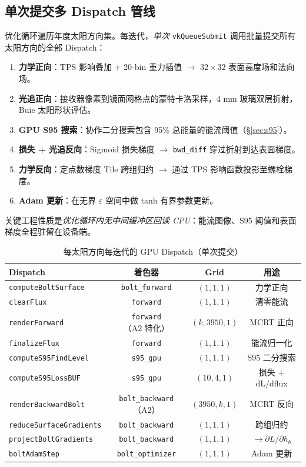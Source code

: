 \documentclass[12pt,a4paper]{ctexart}
\begin{document}
\subsection{单次提交多 Dispatch 管线}

优化循环遍历年度太阳方向集。每迭代，\emph{单次} \verb|vkQueueSubmit| 调用批量提交所有太阳方向的全部 Dispatch：

\begin{enumerate}
  \item \textbf{力学正向}：TPS 影响叠加 + 20-bin 重力插值 $\rightarrow$ $32\times32$ 表面高度场和法向场。
  \item \textbf{光追正向}：接收器像素到镜面网格点的蒙特卡洛采样，4 mm 玻璃双层折射，Buie 太阳形状评估。
  \item \textbf{GPU S95 搜索}：协作二分搜索包含 95\% 总能量的能流阈值（\S\ref{sec:s95}）。
  \item \textbf{损失 + 光追反向}：Sigmoid 损失梯度 $\rightarrow$ \verb|bwd_diff| 穿过折射到达表面梯度。
  \item \textbf{力学反向}：定点数梯度 Tile 跨组归约 $\rightarrow$ 通过 TPS 影响函数投影至螺栓梯度。
  \item \textbf{Adam 更新}：在无界 $\varepsilon$ 空间中做 tanh 有界参数更新。
\end{enumerate}

关键工程性质是\emph{优化循环内无中间缓冲区回读 CPU}：能流图像、S95 阈值和表面梯度全程驻留在设备端。

\begin{table}[t]
\centering
\caption{每太阳方向每迭代的 GPU Dispatch（单次提交）}
\label{tab:dispatch}
\small
\begin{tabular}{lccc}
\toprule
Dispatch & 着色器 & Grid & 用途 \\
\midrule
\verb|computeBoltSurface| & \verb|bolt_forward| & $(1,1,1)$ & 力学正向 \\
\verb|clearFlux| & \verb|forward| & $(1,1,1)$ & 清零能流 \\
\verb|renderForward| & \verb|forward|（A2 特化） & $(k,3950,1)$ & MCRT 正向 \\
\verb|finalizeFlux| & \verb|forward| & $(1,1,1)$ & 能流归一化 \\
\verb|computeS95FindLevel| & \verb|s95_gpu| & $(1,1,1)$ & S95 二分搜索 \\
\verb|computeS95LossBUF| & \verb|s95_gpu| & $(10,4,1)$ & 损失 + dL/dflux \\
\verb|renderBackwardBolt| & \verb|bolt_backward| （A2） & $(3950,k,1)$ & MCRT 反向 \\
\verb|reduceSurfaceGradients| & \verb|bolt_backward| & $(1,1,1)$ & 跨组归约 \\
\verb|projectBoltGradients| & \verb|bolt_backward| & $(1,1,1)$ & $\to \partial L/\partial h_b$ \\
\verb|boltAdamStep| & \verb|bolt_optimizer| & $(1,1,1)$ & Adam 更新 \\
\bottomrule
\end{tabular}
\end{table}
\end{document}
